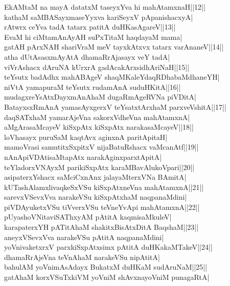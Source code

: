 \documentclass{article}
\begin{document}
EkAMtaM na mayA datatxM taseyxYva hi mahAtamxnaH||12||\\
kathaM saMBASayxmaseYyxva kariSeyxV pApanishacxyA|\\
rAtwrx ceYva tadA tatarx patitA duHKasAgareV||13||\\
EvaM hi ciMtamAnAyAH suPxTitaM haqdayaM mama|\\
gatAH pArxNAH shariVraM meV tayxkAtxvx tatarx varAnaneV||14||\\
atha dUtAsasxmAyAtA dhamaRrAjasayx veY tadA|\\
viVrAshacx dAruNA kUrxrA gadAcakArxsidhAriNaH||15||\\
teYsutx badAdhx mahABAgeV shaqMKaleYdaqRDhabaMdhaneYH|\\
niVtA yamapuraM teYsutx rudamAnA suduHKitA||16||\\
mudagxreYsAtxDayxmAnAhaM dugaRmAgeRVNa piVDitA|\\
BatayxsxRmAnA yamasAyxgerxV teYsatxtArxhaM parxveVshitA||17||\\
daqSATxhaM yamarAjeVna sakorxVdheVna mahAtamxnA|\\
aMgArasaMcayeV kiSxpAtx kiSxpAtx narakasaMcayeV||18||\\
loVhasayx puruSaM kaqtAvx aginxnA paritApitaH|\\
mamoVrasi samutitxSxpitxV nijaBatuRshacx vaMcanAtf||19||\\
nAnApiVDAtisaMtapAtx narakAginxparxtApitA|\\
teYladorxVNAyxM parikiSxpAtx karaMBavAlukoVpari||20||\\
asipaterxYshacx saMciCxnAnx jalayaMterxVNa BAmitA|\\
kUTashAlamxlivaqkeSxVSu kiSxpAtxneVna mahAtamxnA||21||\\
sarevxVSevxVva narakeVSu kiSxpAtxhaM naqpanaMdini|\\
piVDAyuketxVSu tiVverxVSu teVneYvApi mahAtamxnA||22||\\
pUyashoVNitaviSAThxyAM pAtitA kaqmisaMkuleV|\\
karapaterxYH pATitAhaM shakitxBisAtxDitA BaqshaM||23||\\
aneyxVSevxVva narakeVSu pAtitA naqpanaMdini|\\
yoVnivaketxrxV parxkiSxpAtxsimx pAtitA duHKakaMTakeV||24||\\
dhamaRrAjeVna teVnAhaM narakeVSu nipAtitA|\\
bahulAM yoVnimAsAdayx BukatxM duHKaM sudAruNaM||25||\\
gatAhaM korxVSuTxkiVM yoVniM shAvxnayoVniM punagaRtA|\\
\end{document}
